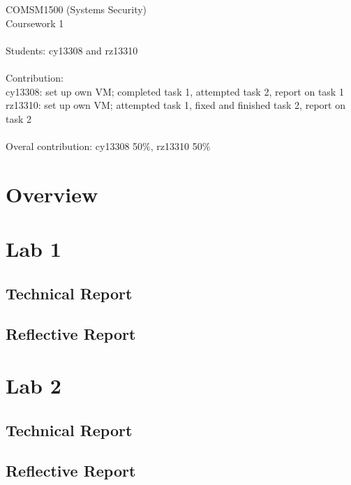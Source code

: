 \documentclass[12pt, onecolumn]{IEEEtran}
\newcommand\tab[1][1cm]{\hspace*{#1}}
\begin{document}
COMSM1500 (Systems Security)\\
Coursework 1\\
\\
Students: cy13308 and rz13310 \\
\\
Contribution: \\
\tab[1cm] cy13308: set up own VM; completed task 1, attempted task 2, report on task 1\\
\tab[1cm] rz13310: set up own VM; attempted task 1, fixed and finished task 2, report on task 2
\\
\\
Overal contribution: cy13308 50\%, rz13310 50\%
\newpage

\section{Overview}

\newpage

\section{Lab 1}
\subsection{Technical Report}

\newpage
\subsection{Reflective Report}

\newpage

\section{Lab 2}
\subsection{Technical Report}

\newpage
\subsection{Reflective Report}




% 
% 
\end{document}
